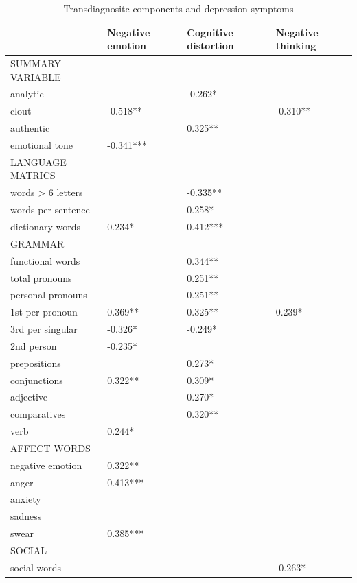 \begin{table}%
\caption{Transdiagnositc components and depression symptoms}
\label{tab:four}
\begin{minipage}{\columnwidth}
\begin{center}
\begin{tabular}{llll}
  \toprule
           & Negative emotion & Cognitive distortion  & Negative thinking  \\ 
  \hline\hline
  SUMMARY VARIABLE   \\
  analytic &  & -0.262* &   \\
  clout & -0.518** &   &-0.310**   \\
  authentic &  & 0.325**  &   \\
  emotional tone & -0.341*** &   &   \\
  LANGUAGE MATRICS &  &   &   \\
  words > 6 letters &  & -0.335**  &   \\
  words per sentence &  & 0.258*  &   \\
  dictionary words & 0.234* & 0.412***  &   \\
  GRAMMAR &  &   &   \\
  functional words &  & 0.344**  &   \\
  total pronouns &  & 0.251**  &   \\
  personal pronouns &  & 0.251**  &   \\
  1st per pronoun & 0.369** & 0.325**  & 0.239*  \\
  3rd per singular &-0.326*& -0.249* &    \\
  2nd person & -0.235* &   &   \\
  prepositions &  & 0.273*  &   \\
  conjunctions &0.322**  & 0.309*  &   \\
  adjective &  & 0.270*  &   \\
  comparatives &  & 0.320**  &   \\
  verb & 0.244* &   &   \\
  AFFECT WORDS &  &   &   \\
  negative emotion &0.322**  &   &   \\
  anger &0.413***  &   &   \\
  anxiety &  &   &   \\
  sadness &  &   &   \\
  swear & 0.385*** &   &   \\
  SOCIAL  &  &   &   \\
  social words &  &   & -0.263*  \\

\end{tabular}
\end{center}
\end{minipage}
\end{table}
